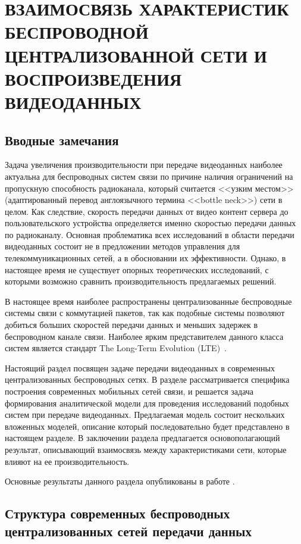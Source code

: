 \chapter{ВЗАИМОСВЯЗЬ ХАРАКТЕРИСТИК БЕСПРОВОДНОЙ ЦЕНТРАЛИЗОВАННОЙ СЕТИ И ВОСПРОИЗВЕДЕНИЯ ВИДЕОДАННЫХ}
\label{chap2}

\section{Вводные замечания}
\label{chap2:Intro}

Задача увеличения производительности при передаче видеоданных наиболее актуальна для беспроводных систем связи по причине наличия ограничений на пропускную способность радиоканала, который считается <<узким местом>> (адаптированный перевод англоязычного термина <<bottle neck>>) сети в целом. Как следствие, скорость передачи данных от видео контент сервера до пользовательского устройства определяется именно скоростью передачи данных по радиоканалу. Основная проблематика всех исследований в области передачи видеоданных состоит не в предложении методов управления для телекоммуникационных сетей, а в обосновании их эффективности. Однако, в настоящее время не существует опорных теоретических исследований, с которыми возможно сравнить производительность предлагаемых решений.

В настоящее время наиболее распространены централизованные беспроводные системы связи с коммутацией пакетов, так как подобные системы позволяют добиться больших скоростей передачи данных и меньших задержек в беспроводном канале связи. Наиболее ярким представителем данного класса систем является стандарт The Long-Term Evolution (LTE)~\cite{opac-b1130916}.

Настоящий раздел посвящен задаче передачи видеоданных в современных централизованных беспроводных сетях. В разделе рассматривается специфика построения современных мобильных сетей связи, и решается задача формирования аналитической модели для проведения исследований подобных систем при передаче видеоданных. Предлагаемая модель состоит нескольких вложенных моделей, описание который последовательно будет представлено в настоящем разделе. В заключении раздела предлагается основополагающий результат, описывающий взаимосвязь между характеристиками сети, которые влияют на ее производительность.

Основные результаты данного раздела опубликованы в работе \cite{past_poly}.

\section{Структура современных беспроводных централизованных сетей передачи данных}
\label{chap2:WirelessSystemStructure}

